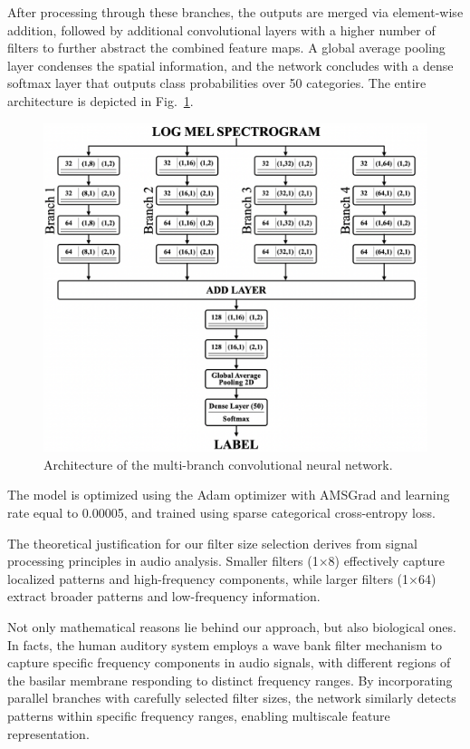 \documentclass{article}
\begin{document}
\begin{sloppy}
After processing through these branches, the outputs are merged via element-wise addition, followed by additional convolutional
layers with a higher number of filters to further abstract the combined feature maps. 
A global average pooling layer condenses the
spatial information, and the network concludes with a dense softmax layer that outputs class probabilities over 50 categories.
The entire architecture is depicted in Fig.~\ref{fig:Entire_architecture}.
\begin{figure}[ht]
  \centering
  \centerline{\includegraphics[width=\columnwidth]{Entire_architecture.png}}
  \caption{Architecture of the multi-branch convolutional neural network.}
  \label{fig:Entire_architecture}
\end{figure}

The model is optimized using the Adam optimizer with AMSGrad and learning rate equal to 0.00005, and trained using sparse categorical cross-entropy loss.

The theoretical justification for our filter size selection derives from signal processing
principles in audio analysis. Smaller filters (1×8) effectively capture localized
patterns and high-frequency components, while larger filters (1×64) extract broader
patterns and low-frequency information.

Not only mathematical reasons lie behind our approach, but also biological ones. In facts, the human auditory system employs a wave bank filter mechanism
to capture specific frequency components in audio signals, with different regions of the
basilar membrane responding to distinct frequency ranges. By incorporating parallel
branches with carefully selected filter sizes, the network similarly detects patterns within specific frequency ranges, enabling multiscale
feature representation.

\end{sloppy}
\end{document}
